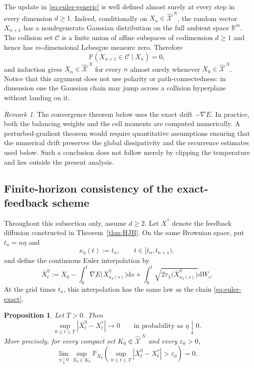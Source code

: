 \documentclass[11pt]{article}
\def\P{\mathbb{P}}
\def\R{\mathbb{R}}
\def\Xc{{\mathcal X}}
\def\hX{\widehat{\Xc}^{\,N}}
\newcommand{\dd}{\mathrm{d}}
\newcommand{\Coll}{\mathscr C}
\newtheorem{proposition}[theorem]{Proposition}
\theoremstyle{definition}
\theoremstyle{remark}
\newtheorem{remark}[theorem]{Remark}
\numberwithin{equation}{section}
\begin{document}
The update in \eqref{eq:euler-generic} is well defined almost surely at every step in every
dimension $d\ge1$.  Indeed, conditionally on $X_n\in\hX$, the random vector $X_{n+1}$ has a
nondegenerate Gaussian distribution on the full ambient space $\R^m$.  The collision set $\Coll$ is
a finite union of affine subspaces of codimension $d\ge1$ and hence has $m$-dimensional Lebesgue
measure zero.  Therefore
\[
 \P(X_{n+1}\in\Coll\mid X_n)=0,
\]
and induction gives $X_n\in\hX$ for every $n$ almost surely whenever $X_0\in\hX$.  Notice that this
argument does not use polarity or path-connectedness: in dimension one the Gaussian chain may jump
across a collision hyperplane without landing on it.

\begin{remark}\label{rem:exact-gradient}
The convergence theorem below uses the exact drift $-\nabla E$.  In practice, both the balancing
weights and the cell moments are computed numerically.  A perturbed-gradient theorem would require
quantitative assumptions ensuring that the numerical drift preserves the global dissipativity and
the recurrence estimates used below.  Such a conclusion does not follow merely by clipping the
temperature and lies outside the present analysis.
\end{remark}

\subsection{Finite-horizon consistency of the exact-feedback scheme}

Throughout this subsection only, assume $d\ge2$.  Let $X^*$ denote the feedback diffusion
constructed in Theorem~\ref{thm:HJB}.  On the same Brownian space, put $t_n=n\eta$ and
\[
 \kappa_\eta(t):=t_n,
 \qquad t\in[t_n,t_{n+1}),
\]
and define the continuous Euler interpolation by
\begin{equation}\label{eq:continuous-Euler-interpolation}
 \overline X_t^\eta
 :=X_0-\int_0^t\nabla E\bigl(\overline X_{\kappa_\eta(s)}^\eta\bigr)\dd s
 +\int_0^t\sqrt{2\tau_\lambda
 \bigl(\overline X_{\kappa_\eta(s)}^\eta\bigr)}\dd W_s.
\end{equation}
At the grid times $t_n$, this interpolation has the same law as the chain
\eqref{eq:euler-exact}.

\begin{proposition}\label{prop:euler-finite-horizon}
Let $T>0$.  Then
\begin{equation}\label{eq:euler-convergence-prob}
 \sup_{0\le t\le T}|\overline X_t^\eta-X_t^*|
 \longrightarrow0
 \qquad\text{in probability as }\eta\downarrow0.
\end{equation}
More precisely, for every compact set $K_0\Subset\hX$ and every $\varepsilon_0>0$,
\begin{equation}\label{eq:euler-convergence-locally-uniform}
 \lim_{\eta\downarrow0}\sup_{X_0\in K_0}
 \P_{X_0}\left(
 \sup_{0\le t\le T}|\overline X_t^\eta-X_t^*|>\varepsilon_0
 \right)=0.
\end{equation}
\end{proposition}
\end{document}
